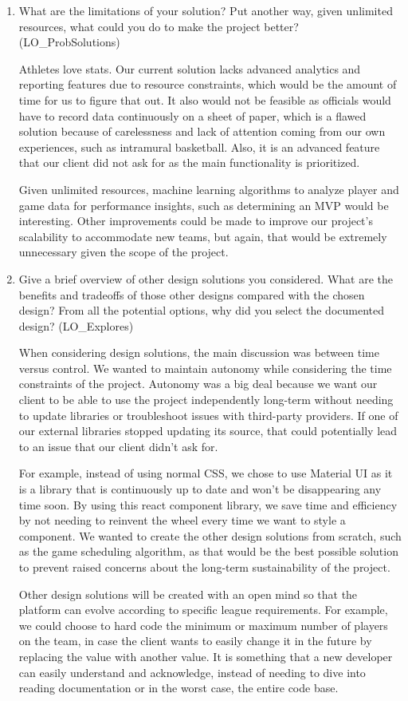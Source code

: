 \documentclass[12pt, titlepage]{article}
\begin{document}
\begin{enumerate}
  \item What are the limitations of your solution?  Put another way, given
        unlimited resources, what could you do to make the project better? (LO\_ProbSolutions)

  Athletes love stats. Our current solution lacks advanced analytics and reporting features due to resource constraints, which would be the amount of time for us to figure that out. It also would not be feasible as officials would have to record data continuously on a sheet of paper, which is a flawed solution because of carelessness and lack of attention coming from our own experiences, such as intramural basketball. Also, it is an advanced feature that our client did not ask for as the main functionality is prioritized. 

  Given unlimited resources, machine learning algorithms to analyze player and game data for performance insights, such as determining an MVP would be interesting. Other improvements could be made to improve our project’s scalability to accommodate new teams, but again, that would be extremely unnecessary given the scope of the project.

  \item Give a brief overview of other design solutions you considered.  What
        are the benefits and tradeoffs of those other designs compared with the chosen
        design?  From all the potential options, why did you select the documented design?
        (LO\_Explores)

  When considering design solutions, the main discussion was between time versus control. We wanted to maintain autonomy while considering the time constraints of the project. Autonomy was a big deal because we want our client to be able to use the project independently long-term without needing to update libraries or troubleshoot issues with third-party providers. If one of our external libraries stopped updating its source, that could potentially lead to an issue that our client didn’t ask for. 

  For example, instead of using normal CSS, we chose to use Material UI as it is a library that is continuously up to date and won’t be disappearing any time soon. By using this react component library, we save time and efficiency by not needing to reinvent the wheel every time we want to style a component. We wanted to create the other design solutions from scratch, such as the game scheduling algorithm, as that would be the best possible solution to prevent raised concerns about the long-term sustainability of the project. 
  
  Other design solutions will be created with an open mind so that the platform can evolve according to specific league requirements. For example, we could choose to hard code the minimum or maximum number of players on the team, in case the client wants to easily change it in the future by replacing the value with another value. It is something that a new developer can easily understand and acknowledge, instead of needing to dive into reading documentation or in the worst case, the entire code base.
\end{enumerate}
\end{document}
